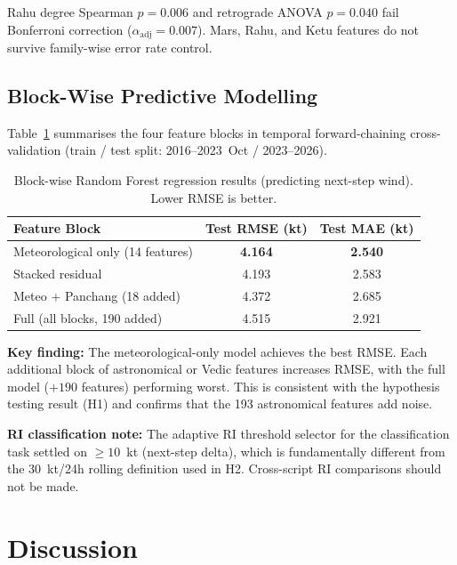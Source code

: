 \documentclass[12pt,a4paper]{article}
\begin{document}
Rahu degree Spearman $p = 0.006$ and retrograde ANOVA $p = 0.040$ fail Bonferroni
correction ($\alpha_{\text{adj}} = 0.007$). Mars, Rahu, and Ketu features do not
survive family-wise error rate control.

\subsection{Block-Wise Predictive Modelling}
\label{sec:models}

Table~\ref{tab:models} summarises the four feature blocks in temporal
forward-chaining cross-validation (train / test split: 2016--2023~Oct / 2023--2026).

\begin{table}[h]
\centering
\caption{Block-wise Random Forest regression results (predicting next-step wind).
  Lower RMSE is better.}
\label{tab:models}
\begin{tabular}{lcc}
\toprule
\textbf{Feature Block} & \textbf{Test RMSE (kt)} & \textbf{Test MAE (kt)} \\
\midrule
Meteorological only (14 features)    & \textbf{4.164} & \textbf{2.540} \\
Stacked residual                     & 4.193          & 2.583 \\
Meteo + Panchang (18 added)          & 4.372          & 2.685 \\
Full (all blocks, 190 added)         & 4.515          & 2.921 \\
\bottomrule
\end{tabular}
\end{table}

\textbf{Key finding:} The meteorological-only model achieves the best RMSE.
Each additional block of astronomical or Vedic features increases RMSE,
with the full model ($+190$ features) performing worst. This is consistent
with the hypothesis testing result (H1) and confirms that the 193 astronomical
features add noise.

\textbf{RI classification note:} The adaptive RI threshold selector for the
classification task settled on $\geq 10$~kt (next-step delta), which is
fundamentally different from the 30~kt/24h rolling definition used in H2.
Cross-script RI comparisons should not be made.

\section{Discussion}
\end{document}
